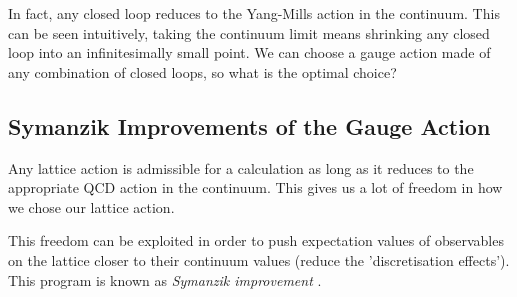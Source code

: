 
In fact, any closed loop reduces to the Yang-Mills action in the continuum. This can be seen intuitively, taking the continuum limit means shrinking any closed loop into an infinitesimally small point. We can choose a gauge action made of any combination of closed loops, so what is the optimal choice?

\subsection{Symanzik Improvements of the Gauge Action}
\label{sec:symanzik_gauge}

Any lattice action is admissible for a calculation as long as it reduces to the appropriate QCD action in the continuum. This gives us a lot of freedom in how we chose our lattice action. %

This freedom can be exploited in order to push expectation values of observables on the lattice closer to their continuum values (reduce the 'discretisation effects'). %
This program is known as {\it{Symanzik improvement}} \cite{Symanzik:1981hc}.

